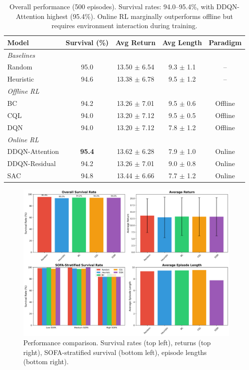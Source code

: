 \begin{table}[htbp]
\centering
\caption{Overall performance (500 episodes). Survival rates: 94.0--95.4\%, with DDQN-Attention highest (95.4\%). Online RL marginally outperforms offline but requires environment interaction during training.}
\label{tab:overall-performance}
\begin{tabular}{lcccc}
\toprule
\textbf{Model} & \textbf{Survival (\%)} & \textbf{Avg Return} & \textbf{Avg Length} & \textbf{Paradigm} \\
\midrule
\multicolumn{5}{l}{\textit{Baselines}} \\
Random          & 95.0               & 13.50 $\pm$ 6.54    & 9.3 $\pm$ 1.1       & -- \\
Heuristic       & 94.6               & 13.38 $\pm$ 6.78    & 9.5 $\pm$ 1.2       & -- \\
\midrule
\multicolumn{5}{l}{\textit{Offline RL}} \\
BC              & 94.2               & 13.26 $\pm$ 7.01    & 9.5 $\pm$ 0.6       & Offline \\
CQL             & 94.0               & 13.20 $\pm$ 7.12    & 9.5 $\pm$ 0.5       & Offline \\
DQN             & 94.0               & 13.20 $\pm$ 7.12    & 7.8 $\pm$ 1.2       & Offline \\
\midrule
\multicolumn{5}{l}{\textit{Online RL}} \\
DDQN-Attention  & \textbf{95.4}      & 13.62 $\pm$ 6.28    & 7.9 $\pm$ 1.0       & Online \\
DDQN-Residual   & 94.2               & 13.26 $\pm$ 7.01    & 9.0 $\pm$ 0.8       & Online \\
SAC             & 94.8               & 13.44 $\pm$ 6.66    & 7.7 $\pm$ 1.2       & Online \\
\bottomrule
\end{tabular}
\end{table}

\begin{figure}[htbp]
\centering
\includegraphics[width=\textwidth]{../results/figures/algorithm_comparison.png}
\caption{Performance comparison. Survival rates (top left), returns (top right), SOFA-stratified survival (bottom left), episode lengths (bottom right).}
\label{fig:algorithm-comparison}
\end{figure}


